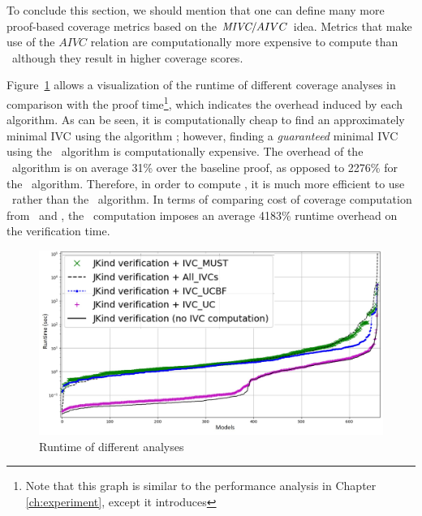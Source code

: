 To conclude this section, we should mention that one can define many more proof-based coverage metrics based on the $\textit{MIVC} /AIVC$ idea. Metrics that make use of the $AIVC$ relation are computationally more expensive to compute than \ivccov\ although they result in higher coverage scores.

Figure~\ref{fig:runtimeall} allows a visualization of the runtime of different coverage analyses
in comparison with the proof time\footnote{Note that this graph is similar to the performance analysis in Chapter \ref{ch:experiment}, except it introduces \mustalg}, which indicates the overhead induced by each algorithm.
As can be seen, it is computationally cheap to find an
approximately minimal IVC using the algorithm \ucalg; however, finding a {\em guaranteed}
minimal IVC using the \ucbfalg\ algorithm is computationally expensive. The overhead of the \ucalg\ algorithm is on average 31\% over the baseline proof, as opposed to 2276\% for the \ucbfalg\ algorithm.
Therefore, in order to compute \ivccov, it is much more efficient to use \ucalg\ rather than the \ucbfalg\ algorithm.
In terms of comparing cost of coverage computation from \ivccov\ and \mustcov ,
the \mustcov\ computation imposes an average 4183\% runtime overhead on the verification time.


\begin{figure}
  \centering
  \includegraphics[width=\columnwidth]{figs/timing_cv.jpg}
  \caption{Runtime of different analyses}\label{fig:runtimeall}
\end{figure}


